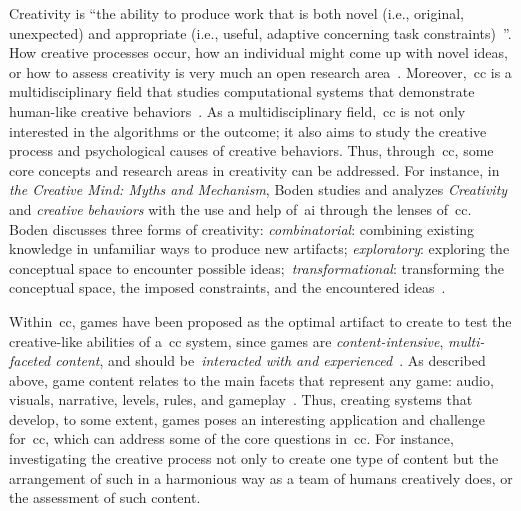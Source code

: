 Creativity is ``the ability to produce work that is both novel (i.e., original, unexpected) and appropriate (i.e., useful, adaptive concerning task constraints)~\cite{sternberg_concept_1999}''. How creative processes occur, how an individual might come up with novel ideas, or how to assess creativity is very much an open research area~\cite{sternberg_handbook_1999,boden_creative_2004,sternberg_creativity_2005,csikszentmihalyi_creativity_1997}. Moreover,~\acrlong{cc} is a multidisciplinary field that studies computational systems that demonstrate human-like creative behaviors~\cite{colton_computational_2012}. As a multidisciplinary field,~\acrshort{cc} is not only interested in the algorithms or the outcome; it also aims to study the creative process and psychological causes of creative behaviors. Thus, through~\acrshort{cc}, some core concepts and research areas in creativity can be addressed. For instance, in \textit{the Creative Mind: Myths and Mechanism}, Boden studies and analyzes \emph{Creativity} and \emph{creative behaviors} with the use and help of~\acrshort{ai} through the lenses of~\acrlong{cc}. Boden discusses three forms of creativity: \textit{combinatorial}: combining existing knowledge in unfamiliar ways to produce new artifacts; \textit{exploratory}: exploring the conceptual space to encounter possible ideas;~\textit{transformational}: transforming the conceptual space, the imposed constraints, and the encountered ideas~\cite{boden_creative_2004}.

Within~\acrshort{cc}, games have been proposed as the optimal artifact to create to test the creative-like abilities of a~\acrshort{cc} system, since games are \emph{content-intensive}, \emph{multi-faceted content}, and should be~\emph{interacted with and experienced}~\cite{liapis_computational_2014}. As described above, game content relates to the main facets that represent any game: audio, visuals, narrative, levels, rules, and gameplay~\cite{liapis_orchestrating_2019}. Thus, creating systems that develop, to some extent, games poses an interesting application and challenge for~\acrshort{cc}, which can address some of the core questions in~\acrshort{cc}. For instance, investigating the creative process not only to create one type of content but the arrangement of such in a harmonious way as a team of humans creatively does, or the assessment of such content.


